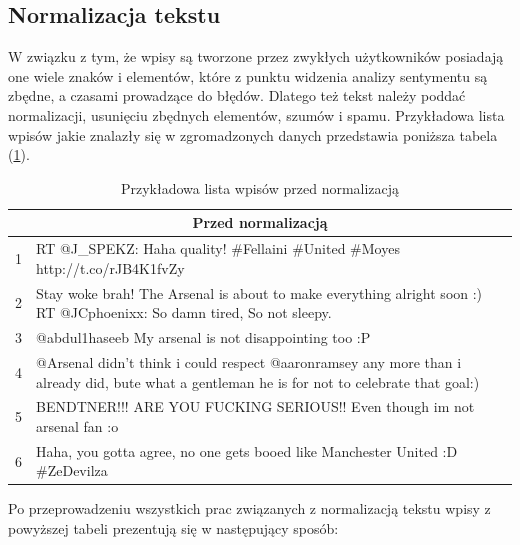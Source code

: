 \subsection{Normalizacja tekstu}

W związku z tym, że wpisy są tworzone przez zwykłych użytkowników posiadają one
wiele znaków i elementów, które z punktu widzenia analizy sentymentu są zbędne,
a czasami prowadzące do błędów. Dlatego też tekst należy poddać normalizacji,
usunięciu zbędnych elementów, szumów i spamu. Przykładowa lista wpisów jakie
znalazły się w zgromadzonych danych przedstawia poniższa tabela
(\ref{tab:wpisy-przed-normalizacja}).


\begin{table}[ht!]  
\begin{center}  
\begin{tabular}{|r|p{140mm}|}
\hline
\multicolumn{2}{|c|}{Przed normalizacją}
\\ \hline
1 & RT @J\_SPEKZ: Haha quality! \#Fellaini \#United \#Moyes
http://t.co/rJB4K1fvZy
\\ \hline
2 & Stay woke brah! The Arsenal is about to make everything alright soon :) RT
@JCphoenixx: So damn tired, So not sleepy.
\\ \hline
3 & @abdul1haseeb My arsenal is not disappointing too :P 
\\ \hline
4 & @Arsenal didn't think i could respect @aaronramsey any more than i already
did, bute what a gentleman he is for not to celebrate that goal:) 
\\ \hline
5 & BENDTNER!!! ARE YOU FUCKING SERIOUS!! Even though im not arsenal fan :o
\\ \hline
6 & Haha, you gotta agree, no one gets booed like Manchester United :D \#ZeDevilza
\\
\hline
\end{tabular} 
\end{center} 
\caption{Przykładowa lista wpisów przed normalizacją}
\label{tab:wpisy-przed-normalizacja}
\end{table}


Po przeprowadzeniu wszystkich prac związanych z normalizacją tekstu wpisy z
powyższej tabeli prezentują się w następujący sposób:

